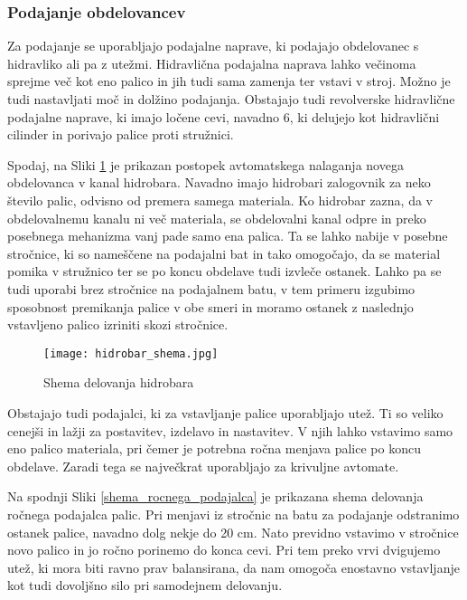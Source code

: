 \subsubsection{Podajanje obdelovancev}
Za podajanje se uporabljajo podajalne naprave, ki podajajo
obdelovanec s hidravliko ali pa z utežmi. Hidravlična podajalna
naprava lahko večinoma sprejme več kot eno palico in jih tudi sama
zamenja ter vstavi v stroj. Možno je tudi nastavljati moč in dolžino
podajanja. Obstajajo tudi revolverske hidravlične podajalne naprave,
ki imajo ločene cevi, navadno 6, ki delujejo kot hidravlični cilinder
in porivajo palice proti stružnici.

Spodaj, na Sliki \ref{hidrobar_nalaganje} je prikazan postopek
avtomatskega nalaganja novega obdelovanca v kanal hidrobara.
Navadno imajo hidrobari zalogovnik za neko število palic, odvisno
od premera samega materiala. Ko hidrobar zazna, da v obdelovalnemu
kanalu ni več materiala, se obdelovalni kanal odpre in preko posebnega
mehanizma vanj pade samo ena palica. Ta se lahko nabije v posebne
stročnice, ki so nameščene na podajalni bat in tako omogočajo, da se
material pomika v stružnico ter se po koncu obdelave tudi izvleče ostanek.
Lahko pa se tudi uporabi brez stročnice na podajalnem batu, v tem primeru izgubimo sposobnost premikanja palice v obe smeri in moramo ostanek z
naslednjo vstavljeno palico izriniti skozi stročnice.
\begin{figure}[H]
	\begin{center}
		\texttt{[image: hidrobar\_shema.jpg]}
		\caption{Shema delovanja hidrobara
			\cite{interna}}
		\label{hidrobar_nalaganje}
	\end{center}
\end{figure}



Obstajajo tudi podajalci, ki za vstavljanje palice uporabljajo
utež. Ti so veliko cenejši in lažji za postavitev, izdelavo in nastavitev.
V njih lahko vstavimo samo eno palico materiala, pri čemer je potrebna ročna menjava
palice po koncu obdelave. Zaradi tega se največkrat uporabljajo za
krivuljne avtomate.

Na spodnji Sliki \ref{shema_rocnega_podajalca} je prikazana shema
delovanja ročnega podajalca palic. Pri menjavi iz stročnic na batu za podajanje
odstranimo ostanek palice, navadno dolg nekje do 20 cm. Nato previdno
vstavimo v stročnice novo palico in jo ročno porinemo do konca cevi.
Pri tem preko vrvi dvigujemo utež, ki mora biti ravno prav balansirana,
da nam omogoča enostavno vstavljanje kot tudi dovoljšno silo pri samodejnem
delovanju.

